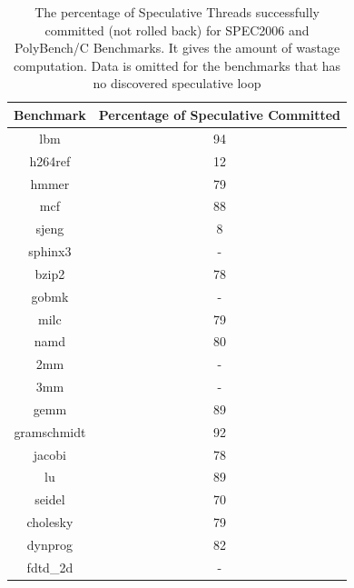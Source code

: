 \documentclass[10pt]{report}          %
\begin{document}
\begin{table}
\centering
\caption{The percentage of Speculative Threads successfully committed (not rolled back) for SPEC2006 and PolyBench/C Benchmarks.  It gives the amount of wastage computation. Data is omitted for the benchmarks that has no discovered speculative loop }
\begin{tabular}{|c||c|} \hline
Benchmark &Percentage of Speculative Committed\\ \hline 
lbm &  94\\ \hline
h264ref & 12  \\ \hline
hmmer &	79	  \\ \hline
mcf & 88 \\ \hline
sjeng &	8 \\ \hline
sphinx3 & -  \\ \hline
bzip2 & 78  \\ \hline
gobmk & -  \\ \hline
milc & 79  \\ \hline
namd & 80  \\ \hline
2mm	& - \\ \hline
3mm	& - \\ \hline
gemm	 & 89 \\ \hline
gramschmidt	& 92 \\ \hline
jacobi & 78 \\ \hline
lu	& 89 \\ \hline
seidel&	70 \\ \hline
cholesky & 79 \\ \hline
dynprog & 82 \\ \hline
fdtd\_2d & - \\ \hline
\hline\end{tabular}
\label{table:spec_committed}
\end{table}
\end{document}
